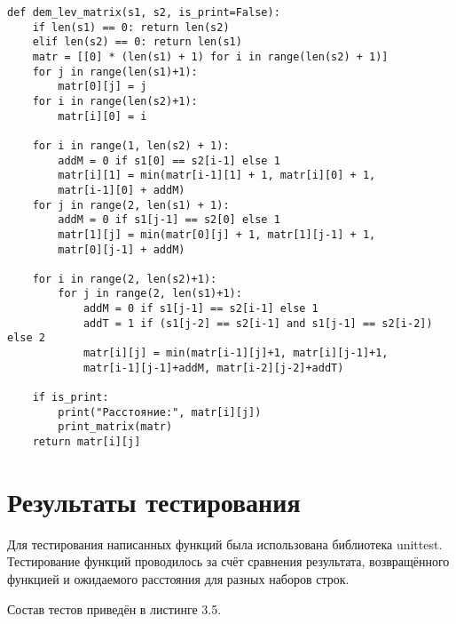 \begin{lstlisting}[caption = Функция нахождения расстояния Дамерау-Левенштейна матричным методом.]
def dem_lev_matrix(s1, s2, is_print=False):
	if len(s1) == 0: return len(s2)
	elif len(s2) == 0: return len(s1)
	matr = [[0] * (len(s1) + 1) for i in range(len(s2) + 1)]
	for j in range(len(s1)+1):
		matr[0][j] = j
	for i in range(len(s2)+1):
		matr[i][0] = i
	
	for i in range(1, len(s2) + 1):
		addM = 0 if s1[0] == s2[i-1] else 1
		matr[i][1] = min(matr[i-1][1] + 1, matr[i][0] + 1,
		matr[i-1][0] + addM)
	for j in range(2, len(s1) + 1):
		addM = 0 if s1[j-1] == s2[0] else 1
		matr[1][j] = min(matr[0][j] + 1, matr[1][j-1] + 1,
		matr[0][j-1] + addM)
	
	for i in range(2, len(s2)+1):
		for j in range(2, len(s1)+1):
			addM = 0 if s1[j-1] == s2[i-1] else 1
			addT = 1 if (s1[j-2] == s2[i-1] and s1[j-1] == s2[i-2]) else 2
			matr[i][j] = min(matr[i-1][j]+1, matr[i][j-1]+1,
			matr[i-1][j-1]+addM, matr[i-2][j-2]+addT)
	
	if is_print:
		print("Расстояние:", matr[i][j])
		print_matrix(matr)
	return matr[i][j]
	\end{lstlisting}
	

\section{Результаты тестирования}
Для тестирования написанных функций была использована библиотека unittest\cite{python_unittest}. Тестирование функций проводилось за счёт сравнения результата, возвращённого функцией и ожидаемого расстояния для разных наборов строк.

Состав тестов приведён в листинге 3.5.

